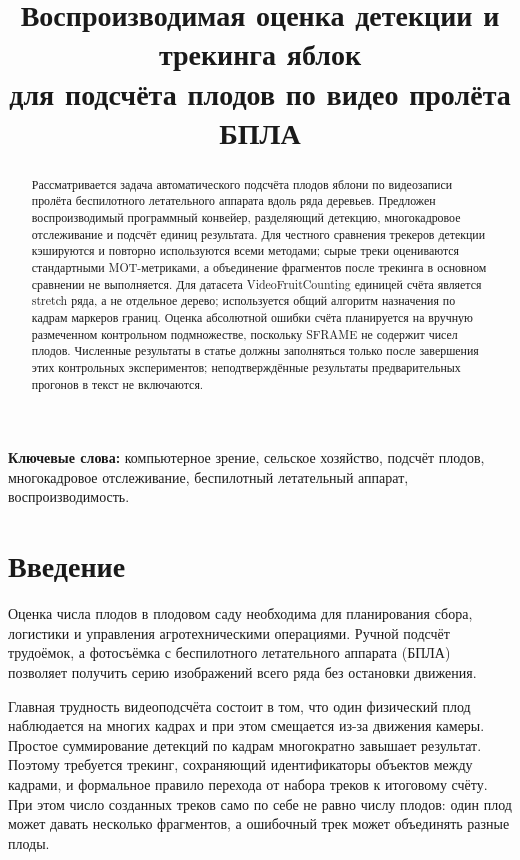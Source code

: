 \documentclass[12pt,a4paper]{article}
\title{\large\bfseries Воспроизводимая оценка детекции и трекинга яблок\\ для подсчёта плодов по видео пролёта БПЛА}
\author{}
\date{}
\begin{document}
\maketitle

\begin{abstract}
Рассматривается задача автоматического подсчёта плодов яблони по
видеозаписи пролёта беспилотного летательного аппарата вдоль ряда деревьев.
Предложен воспроизводимый программный конвейер, разделяющий детекцию,
многокадровое отслеживание и подсчёт единиц результата. Для честного
сравнения трекеров детекции кэшируются и повторно используются всеми
методами; сырые треки оцениваются стандартными MOT-метриками, а объединение
фрагментов после трекинга в основном сравнении не выполняется. Для датасета
VideoFruitCounting единицей счёта является stretch ряда, а не отдельное
дерево; используется общий алгоритм назначения по кадрам маркеров границ.
Оценка абсолютной ошибки счёта планируется на вручную размеченном
контрольном подмножестве, поскольку SFRAME не содержит чисел плодов.
Численные результаты в статье должны заполняться только после завершения
этих контрольных экспериментов; неподтверждённые результаты предварительных
прогонов в текст не включаются.
\end{abstract}

\noindent\textbf{Ключевые слова:} компьютерное зрение, сельское хозяйство,
подсчёт плодов, многокадровое отслеживание, беспилотный летательный
аппарат, воспроизводимость.

\section{Введение}

Оценка числа плодов в плодовом саду необходима для планирования сбора,
логистики и управления агротехническими операциями. Ручной подсчёт
трудоёмок, а фотосъёмка с беспилотного летательного аппарата (БПЛА)
позволяет получить серию изображений всего ряда без остановки движения.

Главная трудность видеоподсчёта состоит в том, что один физический плод
наблюдается на многих кадрах и при этом смещается из-за движения камеры.
Простое суммирование детекций по кадрам многократно завышает результат.
Поэтому требуется трекинг, сохраняющий идентификаторы объектов между
кадрами, и формальное правило перехода от набора треков к итоговому счёту.
При этом число созданных треков само по себе не равно числу плодов: один
плод может давать несколько фрагментов, а ошибочный трек может объединять
разные плоды.
\end{document}
